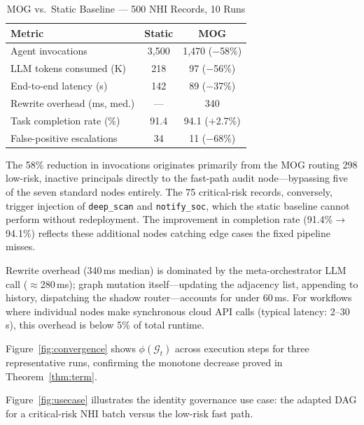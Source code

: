 \documentclass[conference]{IEEEtran}
\begin{document}
\begin{table}[t]
  \centering
  \caption{MOG vs.\ Static Baseline --- 500 NHI Records, 10 Runs}
  \label{tab:results}
  \setlength{\tabcolsep}{4pt}
  \begin{tabular}{@{}lcc@{}}
    \toprule
    \textbf{Metric} & \textbf{Static} & \textbf{MOG} \\
    \midrule
    Agent invocations        & 3{,}500 & 1{,}470 \;($-$58\%) \\
    LLM tokens consumed (K)  & 218     & 97 \;($-$56\%)      \\
    End-to-end latency (s)   & 142     & 89 \;($-$37\%)      \\
    Rewrite overhead (ms, med.) & ---  & 340                  \\
    Task completion rate (\%)   & 91.4 & 94.1 \;($+$2.7\%)   \\
    False-positive escalations  & 34   & 11 \;($-$68\%)       \\
    \bottomrule
  \end{tabular}
\end{table}

The 58\% reduction in invocations originates primarily from the MOG
routing 298 low-risk, inactive principals directly to the fast-path
audit node---bypassing five of the seven standard nodes entirely.
The 75 critical-risk records, conversely, trigger injection of
\texttt{deep\_scan} and \texttt{notify\_soc}, which the static
baseline cannot perform without redeployment. The improvement in
completion rate (91.4\%$\to$94.1\%) reflects these additional nodes
catching edge cases the fixed pipeline misses.

Rewrite overhead (340\,ms median) is dominated by the meta-orchestrator
LLM call ($\approx$280\,ms); graph mutation itself---updating the
adjacency list, appending to history, dispatching the shadow
router---accounts for under 60\,ms. For workflows where individual
nodes make synchronous cloud API calls (typical latency: 2--30\,s),
this overhead is below 5\% of total runtime.

Figure~\ref{fig:convergence} shows $\phi(\mathcal{G}_t)$ across
execution steps for three representative runs, confirming the monotone
decrease proved in Theorem~\ref{thm:term}.

Figure~\ref{fig:usecase} illustrates the identity governance use case:
the adapted DAG for a critical-risk NHI batch versus the low-risk
fast path.

\end{document}
